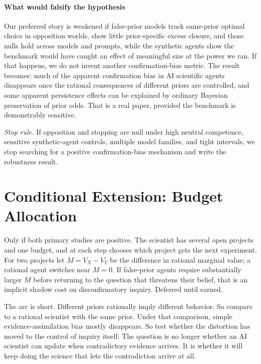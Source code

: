 \documentclass[10pt,letterpaper,twocolumn]{article}
\begin{document}
\paragraph{What would falsify the hypothesis}
Our preferred story is weakened if false-prior models track same-prior optimal choice in opposition worlds, show little prior-specific excess closure, and those nulls hold across models and prompts, while the synthetic agents show the benchmark would have caught an effect of meaningful size at the power we ran. If that happens, we do not invent another confirmation-bias metric. The result becomes: much of the apparent confirmation bias in AI scientific agents disappears once the rational consequences of different priors are controlled, and some apparent persistence effects can be explained by ordinary Bayesian preservation of prior odds. That is a real paper, provided the benchmark is demonstrably sensitive.

\emph{Stop rule.} If opposition and stopping are null under high neutral competence, sensitive synthetic-agent controls, multiple model families, and tight intervals, we stop searching for a positive confirmation-bias mechanism and write the robustness result.

\section{Conditional Extension: Budget Allocation}
\label{sec:allocation}

Only if both primary studies are positive. The scientist has several open projects and one budget, and at each step chooses which project gets the next experiment. For two projects let $M = V_X - V_Y$ be the difference in rational marginal value; a rational agent switches near $M = 0$. If false-prior agents require substantially larger $M$ before returning to the question that threatens their belief, that is an implicit shadow cost on disconfirmatory inquiry. Deferred until earned.

The arc is short. Different priors rationally imply different behavior. So compare to a rational scientist with the same prior. Under that comparison, simple evidence-assimilation bias mostly disappears. So test whether the distortion has moved to the control of inquiry itself. The question is no longer whether an AI scientist can update when contradictory evidence arrives. It is whether it will keep doing the science that lets the contradiction arrive at all.



\end{document}
